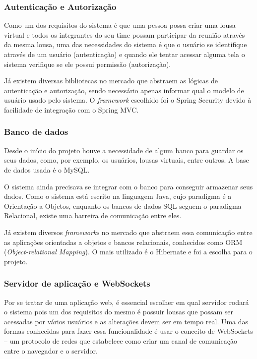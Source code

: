 \subsubsection*{Autenticação e Autorização}

Como um dos requisitos do sistema é que uma pessoa possa criar uma lousa virtual e todos os integrantes do seu time possam participar da reunião através da mesma lousa, uma das necessidades do sistema é que o usuário se identifique através de um usuário (autenticação) e quando ele tentar acessar alguma tela o sistema verifique se ele possui permissão (autorização).

Já existem diversas bibliotecas no mercado que abstraem as lógicas de autenticação e autorização, sendo necessário apenas informar qual o modelo de usuário usado pelo sistema. O \textit{framework} escolhido foi o Spring Security devido à facilidade de integração com o Spring MVC.
\subsubsection*{Banco de dados}

Desde o início do projeto houve a necessidade de algum banco para guardar os seus dados, como, por exemplo, os usuários, lousas virtuais, entre outros. A base de dados usada é o MySQL.

O sistema ainda precisava se integrar com o banco para conseguir armazenar seus dados. Como o sistema  está escrito na linguagem Java, cujo paradigma é a Orientação a Objetos, enquanto os bancos de dados SQL seguem o paradigma Relacional, existe uma barreira de comunicação entre eles.

Já existem diversos \textit{frameworks} no mercado que abstraem essa comunicação entre as aplicações orientadas a objetos e bancos relacionais, conhecidos como ORM (\textit{Object-relational Mapping}). O mais utilizado é o Hibernate e foi a escolha para o projeto.
\subsubsection*{Servidor de aplicação e WebSockets}

Por se tratar de uma aplicação web, é essencial escolher em qual servidor rodará o sistema pois um dos requisitos do mesmo é possuir lousas que possam ser acessadas por vários usuários e as alterações devem ser em tempo real. Uma das formas conhecidas para fazer essa funcionalidade é usar o conceito de WebSockets -- um protocolo de redes que estabelece como criar um canal de comunicação entre o navegador e o servidor.

